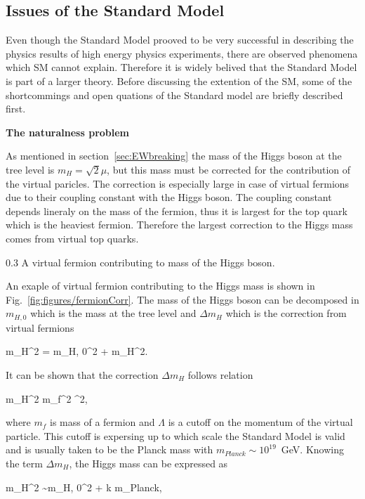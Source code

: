 \subsection{Issues of the Standard Model}

Even though the Standard Model prooved to be very successful in describing the physics results of high energy physics experiments, there are observed phenomena which SM cannot explain. Therefore it is widely belived that the Standard Model is part of a larger theory. Before discussing the extention of the SM, some of the shortcommings and open quations of the Standard model are briefly described first.


\textbf{The naturalness problem}

As mentioned in section~\ref{sec:EWbreaking} the mass of the Higgs boson at the tree level is $m_{H} = \sqrt{2}\mu$, but this mass must be corrected for the contribution of the virtual paricles. The correction is especially large in case of virtual fermions due to their coupling constant with the Higgs boson. The coupling constant depends lineraly on the mass of the fermion, thus it is largest for the top quark which is the heaviest fermion. Therefore the largest correction to the Higgs mass comes from virtual top quarks. 

                 {0.3}       %
                 { A virtual fermion contributing to mass of the Higgs boson.}

An exaple of virtual fermion contributing to the Higgs mass is shown in Fig.~\ref{fig:figures/fermionCorr}. The mass of the Higgs boson can be decomposed in $m_{H,0}$ which is the mass at the tree level and $\Delta m_{H}$ which is the correction from virtual fermions

{
m_{H}^{2} = m_{H, 0}^{2} + \Delta m_{H}^{2}.
}

It can be shown that the correction $\Delta m_{H}$ follows relation

{
\Delta m_{H}^{2} \propto m_{f}^{2} \Lambda^2,
}

where $m_f$ is mass of a fermion and $\Lambda$ is a cutoff on the momentum of the virtual particle. This cutoff is expersing up to which scale the Standard Model is valid and is usually taken to be the Planck mass with $m_{Planck} \sim  10^{19}$~GeV. Knowing the term $\Delta m_{H}$, the Higgs mass can be expressed as

{
m_{H}^{2} \sim m_{H, 0}^{2} + k \cdot m_{Planck},
}

